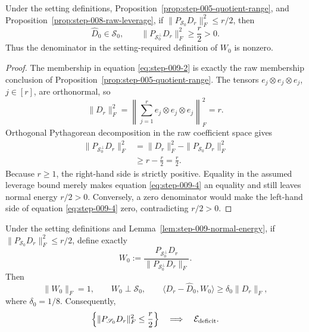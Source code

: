 \begin{lemma}
\label{lem:step-009-normal-energy}
Under the setting definitions,
Proposition~\ref{prop:step-005-quotient-range}, and
Proposition~\ref{prop:step-008-raw-leverage}, if
\(\|P_{\mathscr S_0}D_r\|_F^2\le r/2\), then
\begin{equation}
  \widehat D_0\in\mathscr S_0,
  \qquad
  \|P_{\mathscr S_0^\perp}D_r\|_F^2\ge\frac r2>0.
  \label{eq:step-009-2}
\end{equation}
Thus the denominator in the setting-required definition of \(W_0\) is
nonzero.

\end{lemma}

\begin{proof}
The membership in equation \eqref{eq:step-009-2} is exactly the raw
membership conclusion of
Proposition~\ref{prop:step-005-quotient-range}. The tensors
\(e_j\otimes e_j\otimes e_j\), \(j\in[r]\), are orthonormal, so
\begin{equation}
  \|D_r\|_F^2
  =\left\|\sum_{j=1}^r e_j\otimes e_j\otimes e_j\right\|_F^2
  =r.
  \label{eq:step-009-3}
\end{equation}
Orthogonal Pythagorean decomposition in the raw coefficient space gives
\begin{equation}
\begin{aligned}
  \|P_{\mathscr S_0^\perp}D_r\|_F^2
  &=\|D_r\|_F^2-\|P_{\mathscr S_0}D_r\|_F^2\\
  &\ge r-\frac r2
   =\frac r2.
\end{aligned}\label{eq:step-009-4}
\end{equation}
Because \(r\ge1\), the right-hand side is strictly positive. Equality in
the assumed leverage bound merely makes equation \eqref{eq:step-009-4} an equality and still leaves normal energy
\(r/2>0\). Conversely, a zero denominator would make the left-hand side of
equation \eqref{eq:step-009-4} zero, contradicting \(r/2>0\). 

\end{proof}


\begin{proposition}
\label{prop:step-009-raw-witness}
Under the setting definitions and
Lemma~\ref{lem:step-009-normal-energy}, if
\(\|P_{\mathscr S_0}D_r\|_F^2\le r/2\), define exactly
\begin{equation}
  W_0:=\frac{P_{\mathscr S_0^\perp}D_r}
  {\|P_{\mathscr S_0^\perp}D_r\|_F}.
  \label{eq:step-009-5}
\end{equation}
Then
\begin{equation}
  \|W_0\|_F=1,
  \qquad
  W_0\perp\mathscr S_0,
  \qquad
  \langle D_r-\widehat D_0,W_0\rangle
  \ge\delta_0\|D_r\|_F,
  \label{eq:step-009-6}
\end{equation}
where \(\delta_0=1/8\). Consequently,
\begin{equation}
  \left\{\|P_{\mathscr S_0}D_r\|_F^2\le\frac r2\right\}
  \quad\Longrightarrow\quad
  \mathcal E_{\rm deficit}.
  \label{eq:step-009-7}
\end{equation}

\end{proposition}

